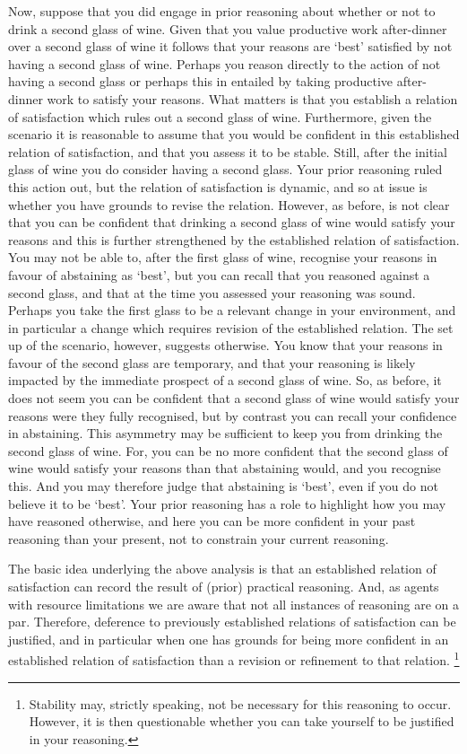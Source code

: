 \documentclass[10pt]{article}
\begin{document}
Now, suppose that you did engage in prior reasoning about whether or not to drink a second glass of wine.
Given that you value productive work after-dinner over a second glass of wine it follows that your reasons are `best' satisfied by not having a second glass of wine.
Perhaps you reason directly to the action of not having a second glass or perhaps this in entailed by taking productive after-dinner work to satisfy your reasons.
What matters is that you establish a relation of satisfaction which rules out a second glass of wine.
Furthermore, given the scenario it is reasonable to assume that you would be confident in this established relation of satisfaction, and that you assess it to be stable.
Still, after the initial glass of wine you do consider having a second glass.
Your prior reasoning ruled this action out, but the relation of satisfaction is dynamic, and so at issue is whether you have grounds to revise the relation.
However, as before, is not clear that you can be confident that drinking a second glass of wine would satisfy your reasons and this is further strengthened by the established relation of satisfaction.
You may not be able to, after the first glass of wine, recognise your reasons in favour of abstaining as `best', but you can recall that you reasoned against a second glass, and that at the time you assessed your reasoning was sound.
Perhaps you take the first glass to be a relevant change in your environment, and in particular a change which requires revision of the established relation.
The set up of the scenario, however, suggests otherwise.
You know that your reasons in favour of the second glass are temporary, and that your reasoning is likely impacted by the immediate prospect of a second glass of wine.
So, as before, it does not seem you can be confident that a second glass of wine would satisfy your reasons were they fully recognised, but by contrast you can recall your confidence in abstaining.
This asymmetry may be sufficient to keep you from drinking the second glass of wine.
For, you can be no more confident that the second glass of wine would satisfy your reasons than that abstaining would, and you recognise this.
And you may therefore judge that abstaining is `best', even if you do not believe it to be `best'.
Your prior reasoning has a role to highlight how you may have reasoned otherwise, and here you can be more confident in your past reasoning than your present, not to constrain your current reasoning.

The basic idea underlying the above analysis is that an established relation of satisfaction can record the result of (prior) practical reasoning.
And, as agents with resource limitations we are aware that not all instances of reasoning are on a par.
Therefore, deference to previously established relations of satisfaction can be justified, and in particular when one has grounds for being more confident in an established relation of satisfaction than a revision or refinement to that relation.\nolinebreak
\footnote{Stability may, strictly speaking, not be necessary for this reasoning to occur.
  However, it is then questionable whether you can take yourself to be justified in your reasoning.}
\end{document}

